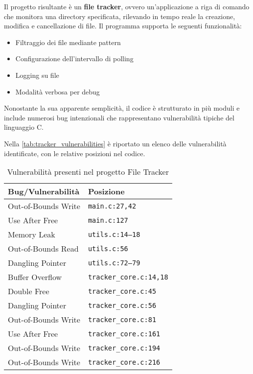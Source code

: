 Il progetto risultante è un \textbf{file tracker}, ovvero un'applicazione a riga
di comando che monitora una directory specificata, rilevando in tempo reale la creazione,
modifica e cancellazione di file. Il programma supporta le seguenti funzionalità:
\begin{itemize}
  \item Filtraggio dei file mediante pattern

  \item Configurazione dell'intervallo di polling

  \item Logging su file

  \item Modalità verbosa per debug
\end{itemize}

Nonostante la sua apparente semplicità, il codice è strutturato in più moduli e
include numerosi bug intenzionali che rappresentano vulnerabilità tipiche del
linguaggio C.

Nella \autoref{tab:tracker_vulnerabilities} è riportato un elenco delle
vulnerabilità identificate, con le relative posizioni nel codice.

\begin{table}[htbp]
  \centering
  \small
  \begin{tabular}{|l|l|}
    \hline
    \textbf{Bug/Vulnerabilità} & \textbf{Posizione}             \\
    \hline
    Out-of-Bounds Write        & \texttt{main.c:27,42}          \\
    \hline
    Use After Free             & \texttt{main.c:127}            \\
    \hline
    Memory Leak                & \texttt{utils.c:14--18}        \\
    \hline
    Out-of-Bounds Read         & \texttt{utils.c:56}            \\
    \hline
    Dangling Pointer           & \texttt{utils.c:72--79}        \\
    \hline
    Buffer Overflow            & \texttt{tracker\_core.c:14,18} \\
    \hline
    Double Free                & \texttt{tracker\_core.c:45}    \\
    \hline
    Dangling Pointer           & \texttt{tracker\_core.c:56}    \\
    \hline
    Out-of-Bounds Write        & \texttt{tracker\_core.c:81}    \\
    \hline
    Use After Free             & \texttt{tracker\_core.c:161}   \\
    \hline
    Out-of-Bounds Write        & \texttt{tracker\_core.c:194}   \\
    \hline
    Out-of-Bounds Write        & \texttt{tracker\_core.c:216}   \\
    \hline
  \end{tabular}
  \caption{Vulnerabilità presenti nel progetto File Tracker}
  \label{tab:tracker_vulnerabilities}
\end{table}

